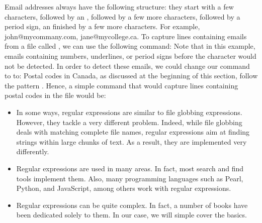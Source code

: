 Email addresses always have the following structure: they start with a few characters, followed by an , followed by a few more characters, followed by a period sign, an finished by a few more characters. For example, john@mycommany.com, jane@mycollege.ca. To capture lines containing emails from a file called , we can use the following command: \newline {}
\vspace{0.5cm}
\newline
Note that in this example, emails containing numbers, underlines, or period signs before the  character would not be detected. In order to detect these emails, we could change our command to to:\newline {}
\vspace{0.5cm}
\newline
Postal codes in Canada, as discussed at the beginning of this section, follow the pattern . Hence, a simple  command that would capture lines containing postal codes in the  file would be: \newline
{}
\vspace{1cm}

\begin{my_box}
\begin{itemize}
\item In some ways, regular expressions are similar to file globbing expressions. However, they tackle a very different problem. Indeed, while file globbing deals with matching complete file names, regular expressions aim at finding strings within large chunks of text. As a result, they are implemented very differently.
\item Regular expressions are used in many areas. In fact, most search and find tools implement them. Also, many programming languages such as Pearl, Python, and JavaScript, among others work with regular expressions.
\item Regular expressions can be quite complex. In fact, a number of books have been dedicated solely to them. In our case, we will simple cover the basics.
\end{itemize}
\end{my_box}

